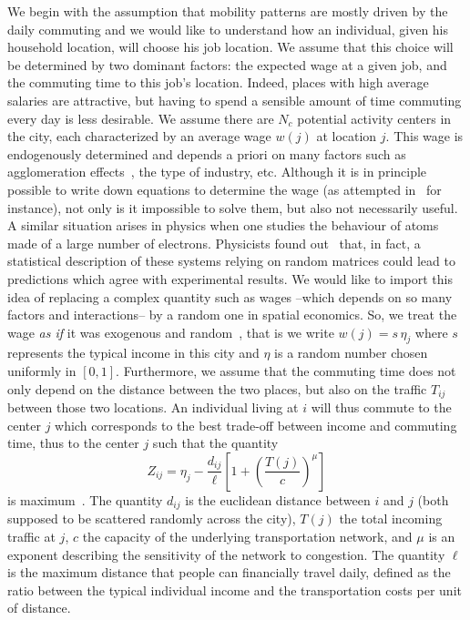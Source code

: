 We begin with the assumption that mobility patterns are mostly driven by the daily commuting and we would like to understand how an individual, given his household location,  will choose his job location. We assume that this choice will be determined by two dominant factors: the expected wage at a given job, and the commuting time to this job's location. Indeed, places with high average salaries are attractive, but having to spend a sensible amount of time commuting every day is less desirable. We assume there are $N_c$ potential activity centers in the city, each characterized by an average wage $w(j)$ at location $j$. This wage is endogenously determined and depends a priori on many factors such as agglomeration effects~\cite{Glaeser:2001}, the type of industry, etc. Although it is in principle possible to write down equations to determine the wage (as attempted in~\cite{Fujita:1982} for instance), not only is it impossible to solve them, but also not necessarily useful. A similar situation arises in physics when one studies the behaviour of atoms made of a large number of electrons. Physicists found out~\cite{Dyson:1962} that, in fact, a statistical description of these systems relying on random matrices could lead to predictions which agree with experimental results. We would like to import this idea of replacing a complex quantity such as wages --which depends on so many factors and interactions-- by a random one in spatial economics. So, we treat the wage \emph{as if} it was exogenous and random~\cite{Louf:2013}, that is we write $w(j)=s\,\eta_j$ where $s$ represents the typical income in this city and $\eta$ is a random number chosen uniformly in $[0,1]$. Furthermore, we assume that the commuting time does not only depend on the distance between the two places, but also on the traffic $T_{ij}$ between those two locations. An individual living at $i$ will thus commute to the center $j$ which corresponds to the best trade-off between income and commuting time, thus to the center $j$ such that the quantity
%
\begin{equation}
Z_{ij} = \eta_j - \frac{d_{ij}}{\ell} \left[ 1 + \left( \frac{T(j)}{c} \right)^\mu \right]
\end{equation}
%
is maximum~\cite{Louf:2013}. The quantity $d_{ij}$ is the euclidean distance between $i$ and $j$ (both supposed to be scattered randomly across the city), $T(j)$ the total incoming traffic at $j$, $c$ the capacity of the underlying transportation network, and $\mu$ is an exponent describing the sensitivity of the network to congestion. The quantity $\ell$ is the maximum distance that people can financially travel daily, defined as the ratio between the typical individual income and the transportation costs per unit of distance.\\

